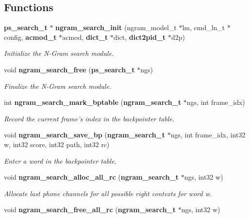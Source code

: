 \subsection*{Functions}
\begin{DoxyCompactItemize}
\item 
{\bf ps\-\_\-search\-\_\-t} $\ast$ {\bf ngram\-\_\-search\-\_\-init} (ngram\-\_\-model\-\_\-t $\ast$lm, cmd\-\_\-ln\-\_\-t $\ast$config, {\bf acmod\-\_\-t} $\ast$acmod, {\bf dict\-\_\-t} $\ast$dict, {\bf dict2pid\-\_\-t} $\ast$d2p)\label{ngram__search_8h_a1db74b6837f13db06470649d3ae84e80}

\begin{DoxyCompactList}\small\item\em Initialize the N-\/\-Gram search module. \end{DoxyCompactList}\item 
void {\bf ngram\-\_\-search\-\_\-free} ({\bf ps\-\_\-search\-\_\-t} $\ast$ngs)\label{ngram__search_8h_a9bafaa4af5a9a4f9e76a8daf54ac4a11}

\begin{DoxyCompactList}\small\item\em Finalize the N-\/\-Gram search module. \end{DoxyCompactList}\item 
int {\bf ngram\-\_\-search\-\_\-mark\-\_\-bptable} ({\bf ngram\-\_\-search\-\_\-t} $\ast$ngs, int frame\-\_\-idx)
\begin{DoxyCompactList}\small\item\em Record the current frame's index in the backpointer table. \end{DoxyCompactList}\item 
void {\bf ngram\-\_\-search\-\_\-save\-\_\-bp} ({\bf ngram\-\_\-search\-\_\-t} $\ast$ngs, int frame\-\_\-idx, int32 w, int32 score, int32 path, int32 rc)\label{ngram__search_8h_ae36649be6f5a2190e759e7ed13bd7b6b}

\begin{DoxyCompactList}\small\item\em Enter a word in the backpointer table. \end{DoxyCompactList}\item 
void {\bf ngram\-\_\-search\-\_\-alloc\-\_\-all\-\_\-rc} ({\bf ngram\-\_\-search\-\_\-t} $\ast$ngs, int32 w)\label{ngram__search_8h_a1ddcc1a9cb3e164ceb2140097ed23a3e}

\begin{DoxyCompactList}\small\item\em Allocate last phone channels for all possible right contexts for word w. \end{DoxyCompactList}\item 
void {\bf ngram\-\_\-search\-\_\-free\-\_\-all\-\_\-rc} ({\bf ngram\-\_\-search\-\_\-t} $\ast$ngs, int32 w)\label{ngram__search_8h_a15477192481dffcb29e9c4167eff6c3c}


\end{DoxyCompactItemize}
